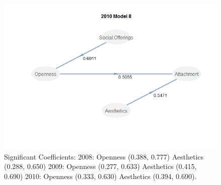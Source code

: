 \documentclass[11pt]{asaproc}
\begin{document}
\begin{figure}[H]
\begin{framed}
\begin{minipage}[b]{0.45\linewidth}
\end{minipage}
\hspace{0.5cm}
\begin{minipage}[b]{0.45\linewidth}
\centering
\includegraphics[width=\textwidth]{Mod22010.png}
\end{minipage}
\hspace{0.5cm}
\begin{minipage}[b]{0.45\linewidth}
\centering
\caption{Significant Coefficients: 
2008: Openness (0.388, 0.777)
      Aesthetics (0.288, 0.650)
2009: Openness (0.277, 0.633)
      Aesthetics (0.415, 0.690)
2010: Openness (0.333, 0.630)
      Aesthetics (0.394, 0.690).}
\label{fig:PLSPMmodel8}
\end{minipage}
\end{framed}
\end{figure}
\end{document}
